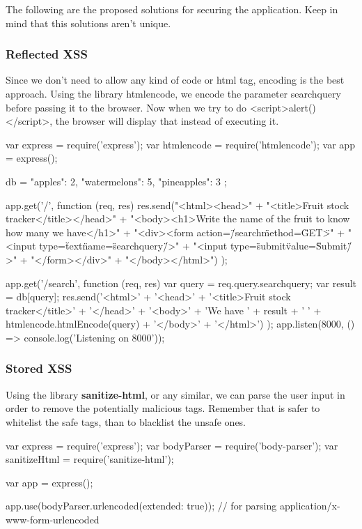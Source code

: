 \begin{Answer}[ref={websec-xss-prevention}]
The following are the proposed solutions for securing the application. Keep in mind that this solutions aren't unique.

\subsubsection{Reflected XSS}
Since we don't need to allow any kind of code or html tag, encoding is the best approach. Using the library htmlencode, we encode the parameter searchquery before passing it to the browser. Now when we try to do <script>alert()</script>, the browser will display that instead of executing it.
\begin{js}
var express = require('express');
var htmlencode = require('htmlencode');
var app = express();

db = {
  "apples": 2,
  "watermelons": 5,
  "pineapples": 3
};

app.get('/', function (req, res) {
  res.send("<html><head>" +
  "<title>Fruit stock tracker</title></head>" +
  "<body><h1>Write the name of the fruit to know how many we have</h1>" +
  "<div><form action=\"/search\" method=\"GET\">" +
  "<input type=\"text\" name=\"searchquery\"/>" +
  "<input type=\"submit\" value=\"Submit\"/>" +
  "</form></div>" +
  "</body></html>")
});


app.get('/search', function (req, res) {
  var query = req.query.searchquery;
  var result = db[query];
  res.send('<html>' +
  '<head>' +
  '<title>Fruit stock tracker</title>' +
  '</head>' +
  '<body>' +
  'We have ' + result + ' ' + htmlencode.htmlEncode(query) +
  '</body>' +
  '</html>')
});
app.listen(8000, () => console.log('Listening on 8000'));
\end{js}
\subsubsection{Stored XSS}
Using the library \textbf{sanitize-html}, or any similar, we can parse the user input in order to remove the potentially malicious tags. Remember that is safer to whitelist the safe tags, than to blacklist the unsafe ones.
\begin{js}
var express = require('express');
var bodyParser = require('body-parser');
var sanitizeHtml = require('sanitize-html');

var app = express();

app.use(bodyParser.urlencoded({extended: true})); // for parsing application/x-www-form-urlencoded


\end{js}
\end{Answer}
